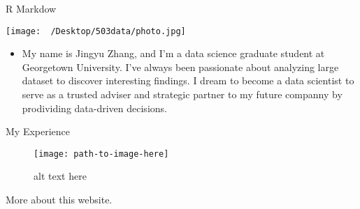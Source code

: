 \begin{frame}{R Markdow}
\protect\hypertarget{r-markdow}{}

\begin{multicols}{2}

  \null \vfill
  \texttt{[image: ~/Desktop/503data/photo.jpg]}
  \vfill \null

\columnbreak

  \null \vfill
  \begin{itemize}
    \item My name is Jingyu Zhang, and I'm a data science graduate student at Georgetown University. I've always been passionate about analyzing large dataset to discover interesting findings. I dream to become a data scientist to serve as a trusted adviser and strategic partner to my future companny by prodividing data-driven decisions.
  \end{itemize}
  \vfill \null
\end{multicols}

\begin{block}{My Experience}

\begin{figure}
\centering
\texttt{[image: path-to-image-here]}
\caption{alt text here}
\end{figure}

More about this website.

\end{block}

\end{frame}
